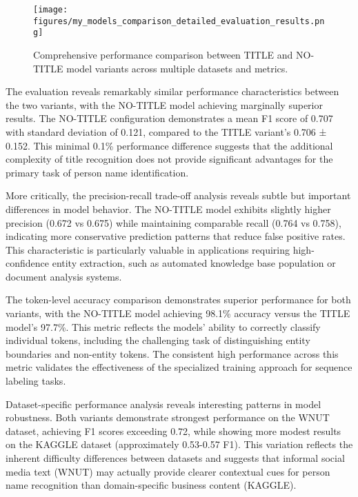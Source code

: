 \documentclass[a4paper]{usiinfbachelorproject}
\begin{document}
\begin{figure}[H]
    \centering
    \texttt{[image: figures/my\_models\_comparison\_detailed\_evaluation\_results.png]}
    \caption{Comprehensive performance comparison between TITLE and NO-TITLE model variants across multiple datasets and metrics.}
    \label{fig:models_comparison}
\end{figure}

The evaluation reveals remarkably similar performance characteristics between the two variants, with the NO-TITLE model achieving marginally superior results. The NO-TITLE configuration demonstrates a mean F1 score of 0.707 with standard deviation of 0.121, compared to the TITLE variant's 0.706 ± 0.152. This minimal 0.1\% performance difference suggests that the additional complexity of title recognition does not provide significant advantages for the primary task of person name identification.

More critically, the precision-recall trade-off analysis reveals subtle but important differences in model behavior. The NO-TITLE model exhibits slightly higher precision (0.672 vs 0.675) while maintaining comparable recall (0.764 vs 0.758), indicating more conservative prediction patterns that reduce false positive rates. This characteristic is particularly valuable in applications requiring high-confidence entity extraction, such as automated knowledge base population or document analysis systems.

The token-level accuracy comparison demonstrates superior performance for both variants, with the NO-TITLE model achieving 98.1\% accuracy versus the TITLE model's 97.7\%. This metric reflects the models' ability to correctly classify individual tokens, including the challenging task of distinguishing entity boundaries and non-entity tokens. The consistent high performance across this metric validates the effectiveness of the specialized training approach for sequence labeling tasks.

Dataset-specific performance analysis reveals interesting patterns in model robustness. Both variants demonstrate strongest performance on the WNUT dataset, achieving F1 scores exceeding 0.72, while showing more modest results on the KAGGLE dataset (approximately 0.53-0.57 F1). This variation reflects the inherent difficulty differences between datasets and suggests that informal social media text (WNUT) may actually provide clearer contextual cues for person name recognition than domain-specific business content (KAGGLE).
\end{document}

